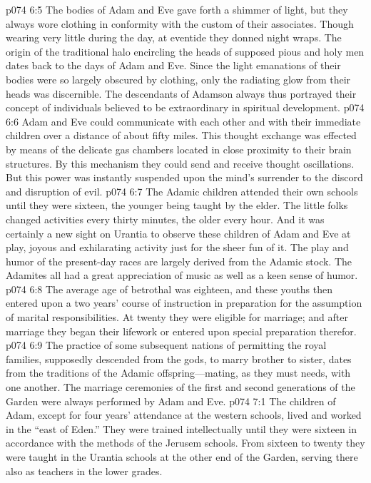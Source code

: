 \pc \vs p074 6:5 The bodies of Adam and Eve gave forth a shimmer of light, but they always wore clothing in conformity with the custom of their associates. Though wearing very little during the day, at eventide they donned night wraps. The origin of the traditional halo encircling the heads of supposed pious and holy men dates back to the days of Adam and Eve. Since the light emanations of their bodies were so largely obscured by clothing, only the radiating glow from their heads was discernible. The descendants of Adamson always thus portrayed their concept of individuals believed to be extraordinary in spiritual development.
\vs p074 6:6 Adam and Eve could communicate with each other and with their immediate children over a distance of about fifty miles. This thought exchange was effected by means of the delicate gas chambers located in close proximity to their brain structures. By this mechanism they could send and receive thought oscillations. But this power was instantly suspended upon the mind’s surrender to the discord and disruption of evil.
\pc \vs p074 6:7 The Adamic children attended their own schools until they were sixteen, the younger being taught by the elder. The little folks changed activities every thirty minutes, the older every hour. And it was certainly a new sight on Urantia to observe these children of Adam and Eve at play, joyous and exhilarating activity just for the sheer fun of it. The play and humor of the present\hyp{}day races are largely derived from the Adamic stock. The Adamites all had a great appreciation of music as well as a keen sense of humor.
\vs p074 6:8 The average age of betrothal was eighteen, and these youths then entered upon a two years’ course of instruction in preparation for the assumption of marital responsibilities. At twenty they were eligible for marriage; and after marriage they began their lifework or entered upon special preparation therefor.
\vs p074 6:9 The practice of some subsequent nations of permitting the royal families, supposedly descended from the gods, to marry brother to sister, dates from the traditions of the Adamic offspring---mating, as they must needs, with one another. The marriage ceremonies of the first and second generations of the Garden were always performed by Adam and Eve.
\vs p074 7:1 The children of Adam, except for four years’ attendance at the western schools, lived and worked in the “east of Eden.” They were trained intellectually until they were sixteen in accordance with the methods of the Jerusem schools. From sixteen to twenty they were taught in the Urantia schools at the other end of the Garden, serving there also as teachers in the lower grades.
